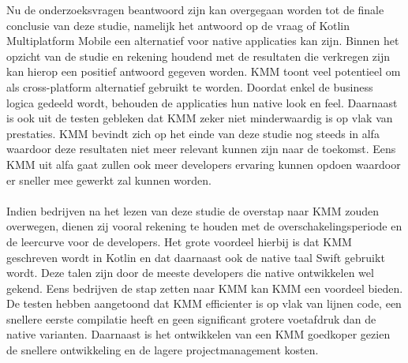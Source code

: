 Nu de onderzoeksvragen beantwoord zijn kan overgegaan worden tot de finale conclusie van deze studie, namelijk het antwoord op de vraag of Kotlin Multiplatform Mobile een alternatief voor native applicaties kan zijn. Binnen het opzicht van de studie en rekening houdend met de resultaten die verkregen zijn kan hierop een positief antwoord gegeven worden. KMM toont veel potentieel om als cross-platform alternatief gebruikt te worden. Doordat enkel de business logica gedeeld wordt, behouden de applicaties hun native look en feel. Daarnaast is ook uit de testen gebleken dat KMM zeker niet minderwaardig is op vlak van prestaties. KMM bevindt zich op het einde van deze studie nog steeds in alfa waardoor deze resultaten niet meer relevant kunnen zijn naar de toekomst. Eens KMM uit alfa gaat zullen ook meer developers ervaring kunnen opdoen waardoor er sneller mee gewerkt zal kunnen worden.
\\ \\
Indien bedrijven na het lezen van deze studie de overstap naar KMM zouden overwegen, dienen zij vooral rekening te houden met de overschakelingsperiode en de leercurve voor de developers. Het grote voordeel hierbij is dat KMM geschreven wordt in Kotlin en dat daarnaast ook de native taal Swift gebruikt wordt. Deze talen zijn door de meeste developers die native ontwikkelen wel gekend. Eens bedrijven de stap zetten naar KMM kan KMM een voordeel bieden. De testen hebben aangetoond dat KMM efficienter is op vlak van lijnen code, een snellere eerste compilatie heeft en geen significant grotere voetafdruk dan de native varianten. Daarnaast is het ontwikkelen van een KMM goedkoper gezien de snellere ontwikkeling en de lagere projectmanagement kosten.


    

